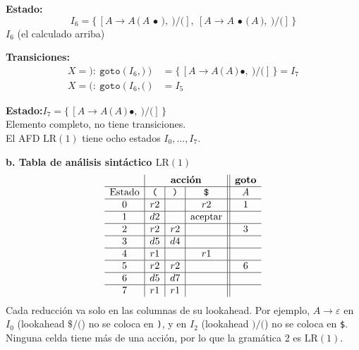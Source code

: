 \documentclass[12pt,letterpaper]{article}
\newcommand{\nt}[1]{\textit{#1}}
\newcommand{\tk}[1]{\texttt{#1}}
\newcommand{\lr}{\mathrm{LR(1)}}
\newcommand{\eps}{\varepsilon}
\begin{document}
\begin{enumerate}[label=\arabic*.]
  \medskip

  \textbf{Estado:}
  \[
  I_6 = \{\, [\nt{A}\to\nt{A}\,\tk{(}\,\nt{A}\,\bullet\,\tk{)},\ \tk{)}/\tk{(}],\
             [\nt{A}\to\nt{A}\,\bullet\,\tk{(}\,\nt{A}\,\tk{)},\ \tk{)}/\tk{(}]\,\}
  \]
  \quad $I_6$ (el calculado arriba)

  \textbf{Transiciones:}
  \[
  \begin{aligned}
    X=\tk{)}:\ \texttt{goto}(I_6,\tk{)}) &= \{\,[\nt{A}\to\nt{A}\,\tk{(}\,\nt{A}\,\tk{)}\,\bullet,\ \tk{)}/\tk{(}]\,\} = \boxed{I_7}\\[3pt]
    X=\tk{(}:\ \texttt{goto}(I_6,\tk{(}) &= I_5
  \end{aligned}
  \]

  \medskip

  \textbf{Estado:}\quad $I_7 = \{\,[\nt{A}\to\nt{A}\,\tk{(}\,\nt{A}\,\tk{)}\,\bullet,\ \tk{)}/\tk{(}]\,\}$\\
  Elemento completo, no tiene transiciones.\\

  El AFD $\lr$ tiene ocho estados $I_0,\ldots,I_7$.

  \bigskip

  \textbf{\large b. Tabla de análisis sintáctico $\lr$}\\
  \[
  \begin{array}{c|c|c|c||c}
    & \multicolumn{3}{c||}{\textbf{acción}} & \textbf{goto} \\ \hline
    \text{Estado} & \tk{(} & \tk{)} & \tk{\$} & \nt{A} \\ \hline
    0 & r2 &    & r2 & 1 \\ \hline
    1 & d2 &    & \text{aceptar} &   \\ \hline
    2 & r2 & r2 &    & 3 \\ \hline
    3 & d5 & d4 &    &   \\ \hline
    4 & r1 &    & r1 &   \\ \hline
    5 & r2 & r2 &    & 6 \\ \hline
    6 & d5 & d7 &    &   \\ \hline
    7 & r1 & r1 &    &   \\
  \end{array}
  \]
  Cada reducción va solo en las columnas de su lookahead. Por ejemplo, $\nt{A}\to\eps$ en $I_0$ (lookahead
  $\tk{\$}/\tk{(}$) no se coloca en \tk{)}, y en $I_2$ (lookahead $\tk{)}/\tk{(}$) no se coloca en \tk{\$}.\\
  
  Ninguna celda tiene más de una acción, por lo que la gramática 2 es $\lr$.


\end{enumerate}
\end{document}
